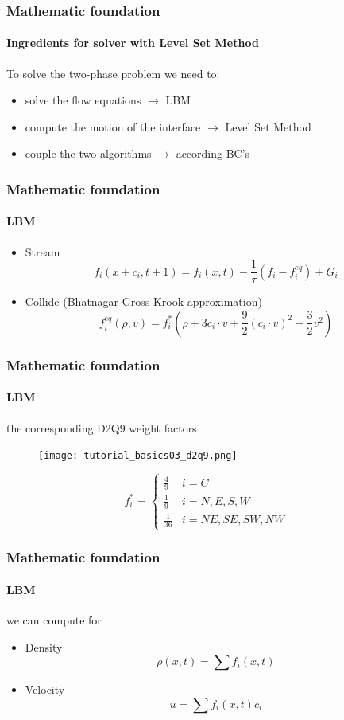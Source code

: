 \documentclass[ucs]{beamer}
\begin{document}
\begin{frame}
\frametitle{Mathematic foundation}
\framesubtitle{Ingredients for solver with Level Set Method}
To solve the two-phase problem we need to:
\begin{itemize}
\item<1-> solve the flow equations $\rightarrow$ LBM
\item<2-> compute the motion of the interface $\rightarrow$ Level Set Method
\item<3-> couple the two algorithms $\rightarrow$ according BC's %
\end{itemize}
\end{frame}


\begin{frame}
\frametitle{Mathematic foundation}
\framesubtitle{LBM}
\begin{itemize}
\item<1-> Stream
$$f_i(x+c_i,t+1) = f_i(x,t) - \frac{1}{\tau}(f_i - f_i^{eq}) + G_i$$
\item<2-> Collide (Bhatnagar-Gross-Krook approximation)
$$f_i^{eq}(\rho,v) = f_i^{*}(\rho + 3c_i \cdot v + \frac{9}{2}(c_i \cdot v)^2 - \frac{3}{2}v^2)$$
\end{itemize}
\end{frame}

\begin{frame}
\frametitle{Mathematic foundation}
\framesubtitle{LBM}
the corresponding D2Q9 weight factors
\begin{figure}[h!]
\texttt{[image: tutorial\_basics03\_d2q9.png]}
\end{figure}
$$f_i^* = \begin{cases} \frac49 & i = C \\ \frac19 & i = N,E,S,W \\ \frac{1}{36} &  i = NE,SE,SW,NW \end{cases}$$
\end{frame}

\begin{frame}
\frametitle{Mathematic foundation}
\framesubtitle{LBM}
we can compute for
\begin{itemize}
\item Density
$$\rho(x,t) = \sum f_i(x,t)$$
\item Velocity
$$u = \sum f_i(x,t)c_i$$
\end{itemize}
\end{frame}
\end{document}
